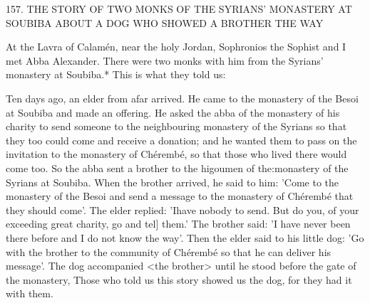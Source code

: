 157.
THE STORY OF TWO MONKS
OF THE SYRIANS' MONASTERY AT
SOUBIBA ABOUT A DOG WHO SHOWED A BROTHER
THE WAY

At the Lavra of Calamén, near the holy Jordan, Sophronios the
Sophist and I met Abba Alexander.
There were two monks with
him from the Syrians' monastery at Soubiba.* This is what they told
us:

Ten days ago, an elder from afar arrived.
He came to the monastery
of the Besoi at Soubiba and made an offering.
He asked the abba
of the monastery of his charity to send someone to the neighbouring
monastery of the Syrians so that they too could come and receive
a donation; and he wanted them to pass on the invitation to the
monastery of Chérembé, so that those who lived there would come
too.
So the abba sent a brother to the higoumen of the:monastery
of the Syrians at Soubiba.
When the brother arrived, he said to him:
'Come to the monastery of the Besoi and send a message to the
monastery of Chérembé that they should come'.
The elder replied:
'Ihave nobody to send.
But do you, of your exceeding great charity,
go and tel] them.' The brother said: 'I have never been there before
and I do not know the way'.
Then the elder said to his little dog:
'Go with the brother to the community of Chérembé so that he can
deliver his message'.
The dog accompanied <the brother> until he
stood before the gate of the monastery, Those who told us this story
showed us the dog, for they had it with them.

